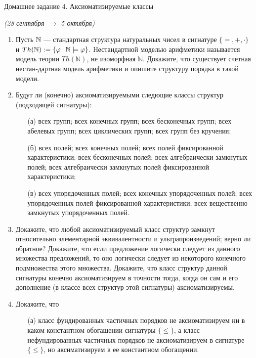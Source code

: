 \documentclass[a4paper,11pt]{article}
\begin{document}
\begin{center}
	{\Large Домашнее задание 4. Аксиоматизируемые классы}

	{\it (28 сентября\ \(\to\) 5 октября)}
\end{center}

\begin{enumerate}
	\item Пусть $\bn$ --- стандартная структура натуральных чисел в сигнатуре $\{=,+,\cdot\}$ и $Th(\mathbb{N}):=\set*{\varphi\:\middle\vert\:\mathbb{N}\models\varphi}$. Нестандартной моделью арифметики называется модель теории $Th(\mathbb{N})$, не изоморфная $\mathbb{N}$. Докажите, что существует счетная нестан-\linebreak дартная модель арифметики и опишите структуру порядка в такой модели.

	\item Будут ли (конечно) аксиоматизируемыми следющие классы структур (подходящей сигнатуры):

\begin{enumerate}
\item[(а)] всех групп; всех конечных групп; всех бесконечных групп; всех абелевых групп; всех циклических групп; всех групп без кручения;

\item[(б)] всех полей; всех конечных полей; всех полей фиксированной характеристики; всех бесконечных полей; всех алгебраически замкнутых полей; всех алгебраически замкнутых полей фиксированной характеристики;

\item[(в)] всех упорядоченных полей; всех конечных упорядоченных  полей; всех упорядоченных  полей фиксированной характеристики; всех вещественно замкнутых упорядоченных  полей.
\end{enumerate}

	\item Докажите, что любой аксиоматизируемый класс структур замкнут относительно элементарной эквивалентности и ультрапроизведений; верно ли обратное? 
Докажите, что если предложение логически следует из данного множества предложений, то оно логически следует из некоторого конечного подмножества этого множества.
Докажите,  что класс структур данной сигнатуры конечно аксиоматизируем в точности тогда, когда он сам и его дополнение (в классе всех структур этой сигнатуры) аксиоматизируемы.

	\item Докажите, что
\begin{enumerate}
\item[(а)] класс фундированных частичных порядков не аксиоматизируем ни в каком константном обогащении сигнатуры $\{\leq\}$, а класс нефундированных частичных порядков не аксиоматизируем в сигнатуре $\{\leq\}$, но аксиматизируем в ее константном обогащении.


\end{enumerate}
\end{enumerate}
\end{document}
